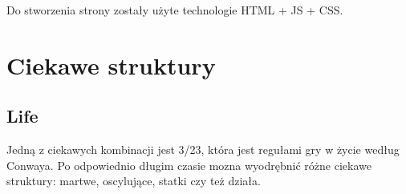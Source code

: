\documentclass[12pt]{article}
\begin{document}
Do stworzenia strony zostały użyte technologie HTML + JS + CSS.

\section{Ciekawe struktury}
\subsection{Life}
Jedną z ciekawych kombinacji jest 3/23, która jest regułami gry w życie według Conwaya. Po odpowiednio długim czasie mozna wyodrębnić różne ciekawe struktury: martwe, oscylujące, statki czy też działa.

\end{document}
